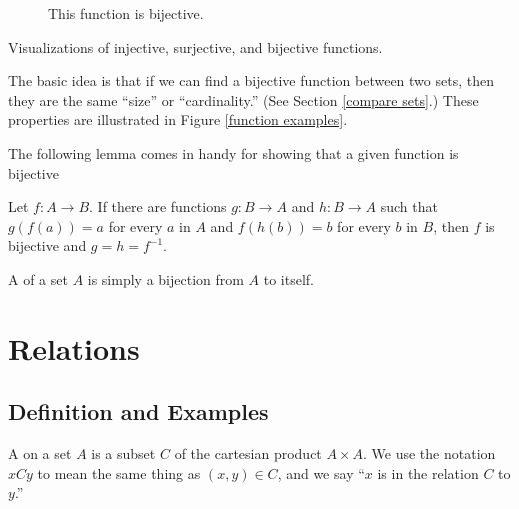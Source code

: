 \begin{marginfigure}
\begin{subfigure}{2in}
	\caption{This function is bijective.}\label{bij function}
\end{subfigure}
\caption{Visualizations of injective, surjective, and bijective 
functions.}\label{function examples}
\end{marginfigure}

The basic idea is that if we can find a bijective function 
between two sets, then they are the same ``size'' or 
``cardinality.'' (See Section \ref{compare sets}.)
These properties are illustrated in Figure \ref{function 
examples}. 

The following lemma comes in handy for showing that a given 
function is bijective

\begin{lemma}
	Let $f : A \to B$. If there are functions $g : B \to A$ and 
	$h : B \to A$ such that $g(f(a)) = a$ for every $a$ in $A$ 
	and $f(h(b)) = b$ for every $b$ in $B$, then $f$ is bijective 
	and $g = h = f^{-1}$.
\end{lemma}

\begin{example}
	A  of a set $A$ is simply a bijection from $A$ to itself.
\end{example}


\newpage

\section{Relations}

\subsection{Definition and Examples}

\begin{definition}[Relation]
	A  on a set $A$ is a subset $C$ of the cartesian product $A \times A$. We use the notation $xCy$ to mean the same thing as $(x,y) \in C$, and we say ``$x$ is in the relation $C$ to $y$.''
\end{definition}

